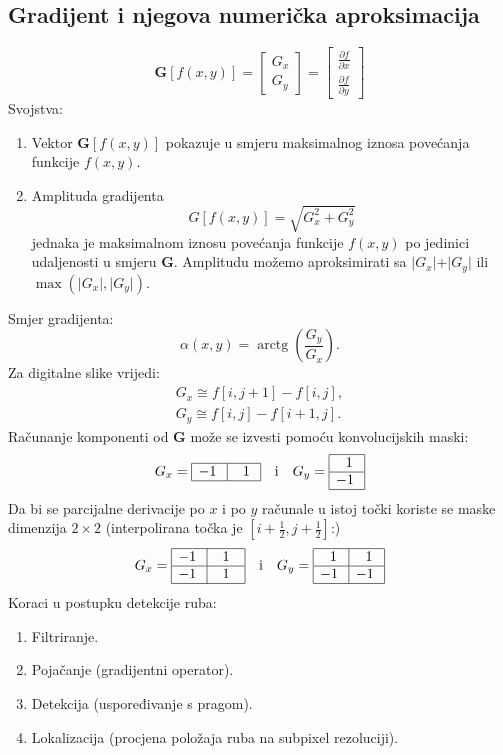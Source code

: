 \documentclass[11pt,english]{article}
\begin{document}
\subsection{Gradijent i njegova numerička aproksimacija}
$$\mathbf G[f(x,y)] = \begin{bmatrix}G_x\\ G_y\end{bmatrix} = \begin{bmatrix}\frac{\partial f}{\partial x}\\ \frac{\partial f}{\partial y}\end{bmatrix}$$
Svojstva:
\begin{enumerate}
  \item Vektor $\mathbf G[f(x,y)]$ pokazuje u smjeru maksimalnog iznosa povećanja funkcije $f(x,y)$.
  \item Amplituda gradijenta
  $$G[f(x,y)] = \sqrt{G_x^2 + G_y^2}$$
  jednaka je maksimalnom iznosu povećanja funkcije $f(x,y)$ po jedinici udaljenosti u smjeru $\mathbf G$.
Amplitudu možemo aproksimirati sa $\vert G_x \vert + \vert G_y \vert$ ili $\max(\vert G_x\vert,\vert G_y\vert)$.
\end{enumerate}
Smjer gradijenta:
$$\alpha(x,y) = \operatorname{arctg}\left ( \frac{G_y}{G_x}\right ).$$
Za digitalne slike vrijedi:
\begin{align*}
G_x \cong f[i,j+1]-f[i,j],\\
G_y \cong f[i,j]-f[i+1,j].
\end{align*}
Računanje komponenti od $\mathbf G$ može se izvesti pomoću konvolucijskih maski:
$$G_x = \begin{array}{|c|c|}\hline -1\; & \;~1\;\\ \hline \end{array} \quad \text{i} \quad G_y = \begin{array}{|c|}\hline \;~1\; \\\hline -1\;\\ \hline \end{array}$$
Da bi se parcijalne derivacije po $x$ i po $y$ računale u istoj točki 
koriste se maske dimenzija $2 \times 2$ (interpolirana točka je $\left [i+\frac{1}{2},j+\frac{1}{2}\right ]$:)
$$G_x =
\begin{array}{|c|c|}
\hline
-1\; & \;~1~\;\\ \hline
-1\; & \;~1~\;\\ \hline
\end{array}
\quad \text{i} \quad
G_y =
\begin{array}{|c|c|}
\hline
\;~1\; & \;~1\;\\ \hline
-1\; & -1\;\\ \hline
\end{array}$$
Koraci u postupku detekcije ruba:
\begin{enumerate}
  \item Filtriranje.
  \item Pojačanje (gradijentni operator).
  \item Detekcija (uspoređivanje s pragom).
  \item Lokalizacija (procjena položaja ruba na subpixel rezoluciji).
\end{enumerate}
\end{document}
